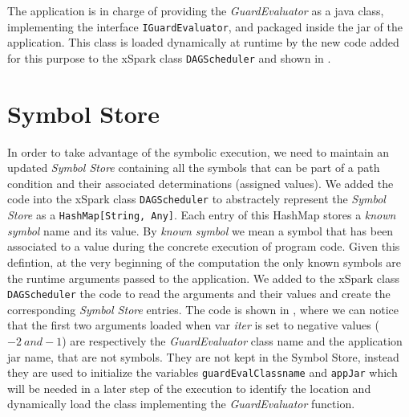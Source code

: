 The application is in charge of providing the \textit{GuardEvaluator} as a java class, implementing the interface \texttt{IGuardEvaluator}, and packaged inside the jar of the application. This class is loaded dynamically at runtime by the new code added for this purpose to the xSpark class \texttt{DAGScheduler} and shown in .


\section{Symbol Store}\label{sec:symbol_store}
In order to take advantage of the symbolic execution, we need to maintain an updated   \textit{Symbol Store} containing all the symbols that can be part of a path condition and their associated determinations (assigned values). We added the code into the xSpark class \texttt{DAGScheduler} to abstractely represent the \textit{Symbol Store} as a  \texttt{HashMap[String, Any]}. Each entry of this HashMap stores a \textit{known symbol} name and its value. By \textit{known symbol} we mean a symbol that has been associated to a value during the concrete execution of program code. Given this defintion, at the very beginning of the computation the only known symbols are the runtime arguments passed to the application. We added to the xSpark class \texttt{DAGScheduler} the code to read the arguments and their values and create the corresponding \textit{Symbol Store} entries. The code is shown in , where we can notice that the first two arguments loaded when var \textit{iter} is set to negative values ($-2\ and -1$) are respectively the \textit{GuardEvaluator} class name and the application jar name, that are not symbols. They are not kept in the Symbol Store, instead they are used to initialize the variables \texttt{guardEvalClassname} and \texttt{appJar} which will be needed in a later step of the execution to identify the location and dynamically load the class implementing the \textit{GuardEvaluator} function.


